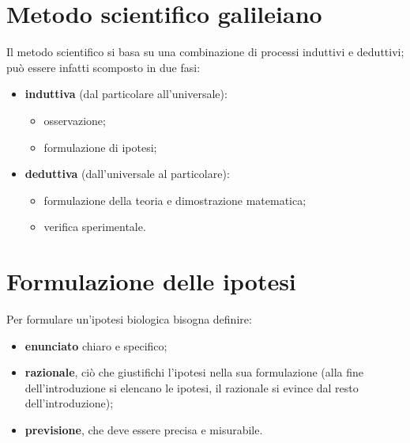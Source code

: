 \documentclass[10pt, draft]{book}
\newcommand{\tightlist}{%
\setlength{\itemsep}{1pt}\setlength{\parskip}{0pt}\setlength{\parsep}{0pt}}
\begin{document}
\section{Metodo scientifico galileiano}
Il metodo scientifico si basa su una combinazione di processi induttivi e deduttivi; può essere infatti scomposto in due fasi:
\begin{itemize} \tightlist
    \item \textbf{induttiva} (dal particolare all'universale):
    \begin{itemize} \tightlist
        \item osservazione;
        \item formulazione di ipotesi;
    \end{itemize}
    \item \textbf{deduttiva} (dall'universale al particolare):
    \begin{itemize} \tightlist
        \item formulazione della teoria e dimostrazione matematica;
        \item verifica sperimentale.
    \end{itemize}
\end{itemize}

\section{Formulazione delle ipotesi}
Per formulare un'ipotesi biologica bisogna definire:
\begin{itemize} \tightlist
    \item \textbf{enunciato} chiaro e specifico;
    \item \textbf{razionale}, ciò che giustifichi l'ipotesi nella sua formulazione (alla fine dell'introduzione si elencano le ipotesi, il razionale si evince dal resto dell'introduzione);
    \item \textbf{previsione}, che deve essere precisa e misurabile.
\end{itemize}
\end{document}
